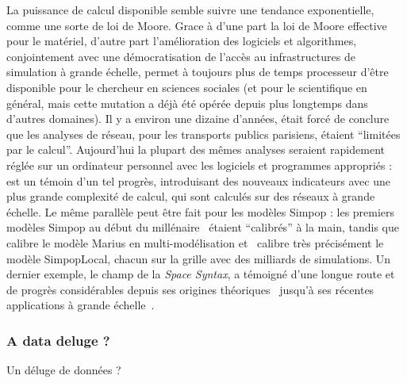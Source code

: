 {La puissance de calcul disponible semble suivre une tendance exponentielle, comme une sorte de loi de Moore. Grace à d'une part la loi de Moore effective pour le matériel, d'autre part l'amélioration des logiciels et algorithmes, conjointement avec une démocratisation de l'accès au infrastructures de simulation à grande échelle, permet à toujours plus de temps processeur d'être disponible pour le chercheur en sciences sociales (et pour le scientifique en général, mais cette mutation a déjà été opérée depuis plus longtemps dans d'autres domaines). Il y a environ une dizaine d'années, \cite{gleyze2005vulnerabilite} était forcé de conclure que les analyses de réseau, pour les transports publics parisiens, étaient ``limitées par le calcul''. Aujourd'hui la plupart des mêmes analyses seraient rapidement réglée sur un ordinateur personnel avec les logiciels et programmes appropriés : \cite{2015arXiv151201268L} est un témoin d'un tel progrès, introduisant des nouveaux indicateurs avec une plus grande complexité de calcul, qui sont calculés sur des réseaux à grande échelle. Le même parallèle peut être fait pour les modèles Simpop : les premiers modèles Simpop au début du millénaire~\cite{sanders1997simpop} étaient ``calibrés'' à la main, tandis que \cite{cottineau2015modular} calibre le modèle Marius en multi-modélisation et~\cite{schmitt2014half} calibre très précisément le modèle SimpopLocal, chacun sur la grille avec des milliards de simulations. Un dernier exemple, le champ de la \emph{Space Syntax}, a témoigné d'une longue route et de progrès considérables depuis ses origines théoriques~\cite{hillier1989social} jusqu'à ses récentes applications à grande échelle~\cite{hillier2016fourth}.
}


\subsubsection{A data deluge ?}{Un déluge de données ?}

